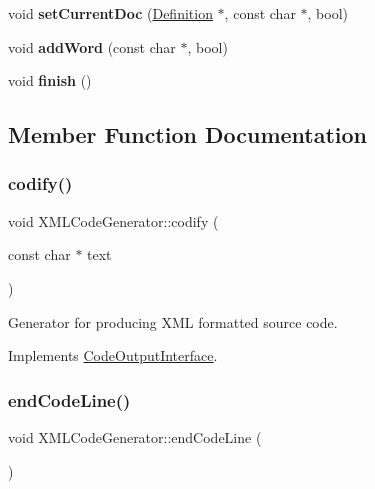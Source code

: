 \begin{DoxyCompactItemize}
\mbox{\label{class_x_m_l_code_generator_a914538997a35d89bea60f82f2357dbba}} 
void {\bfseries set\+Current\+Doc} (\mbox{\hyperlink{class_definition}{Definition}} $\ast$, const char $\ast$, bool)
\item 
\mbox{\label{class_x_m_l_code_generator_ad881d483a68619cc88b9022f85f116ea}} 
void {\bfseries add\+Word} (const char $\ast$, bool)
\item 
\mbox{\label{class_x_m_l_code_generator_a28def93f4623a2788f74a072a6a72a7d}} 
void {\bfseries finish} ()
\end{DoxyCompactItemize}


\subsection{Member Function Documentation}
\mbox{\label{class_x_m_l_code_generator_a40ff443bfb15f9f862f8bd3ceb50ce89}} 
\subsubsection{\texorpdfstring{codify()}{codify()}}
{\footnotesize\ttfamily void X\+M\+L\+Code\+Generator\+::codify (\begin{DoxyParamCaption}\item[{const char $\ast$}]{text }\end{DoxyParamCaption})\hspace{0.3cm}{\ttfamily [virtual]}}

Generator for producing X\+ML formatted source code. 

Implements \mbox{\hyperlink{class_code_output_interface_aa29a5eedda08596ace50ed5b59c8ae7f}{Code\+Output\+Interface}}.

\mbox{\label{class_x_m_l_code_generator_a47927ff273870cc7713f2d20e8c2beb3}} 
\subsubsection{\texorpdfstring{endCodeLine()}{endCodeLine()}}
{\footnotesize\ttfamily void X\+M\+L\+Code\+Generator\+::end\+Code\+Line (\begin{DoxyParamCaption}{ }\end{DoxyParamCaption})\hspace{0.3cm}{\ttfamily [virtual]}}

